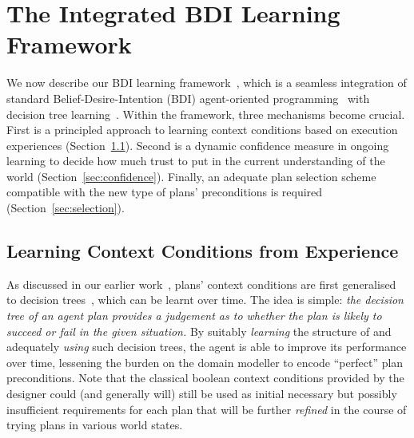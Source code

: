 \section{The Integrated BDI Learning Framework}\label{sec:framework}


We now describe our BDI learning framework~\cite{airiau09:enhancing,singh10:extending,singh10:learning}, which is a seamless integration of standard Belief-Desire-Intention (BDI) agent-oriented programming~\cite{WooldridgeBook} with decision tree learning~\cite{Mitchell97:ML}. 
%
Within the framework, three mechanisms become crucial. First is a principled approach to learning context conditions based on execution experiences (Section~\ref{sec:context}). Second is a dynamic confidence measure in ongoing learning to decide how much trust to put in the current understanding of the world (Section~\ref{sec:confidence}). Finally, an adequate plan selection scheme compatible with the new type of plans' preconditions is required (Section~\ref{sec:selection}).

\subsection{Learning Context Conditions from Experience}\label{sec:context}

As discussed in our earlier work~\cite{airiau09:enhancing,singh10:extending,singh10:learning}, plans' context conditions are first generalised to decision trees~\cite{Mitchell97:ML}, which can be learnt over time.
The idea is simple: \emph{the decision tree of an agent plan provides a judgement as to whether the plan is likely to succeed or fail in the given situation.}
By suitably \emph{learning} the structure of and adequately \emph{using} such decision trees, the agent is able to improve its performance over time, lessening the burden on the domain modeller to encode ``perfect'' plan preconditions. Note that the classical boolean context conditions provided by the designer could (and generally will) still be used as initial necessary but possibly insufficient requirements for each plan that will be further \emph{refined} in the course of trying plans in various world states.

